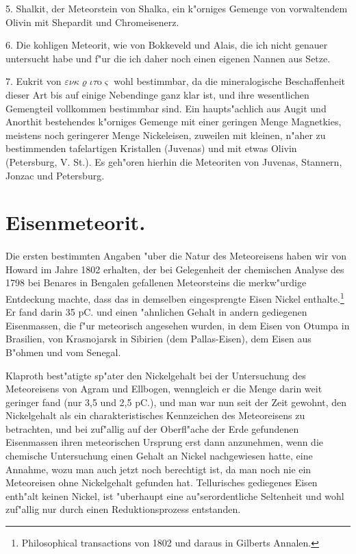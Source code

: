 \documentclass[a4paper, 11pt, oneside]{article}
\begin{document}
5. Shalkit, der Meteorstein von Shalka, ein k"orniges Gemenge von vorwaltendem Olivin mit Shepardit und Chromeisenerz.

6. Die kohligen Meteorit, wie von Bokkeveld und Alais, die ich nicht genauer untersucht habe und f"ur die ich daher noch einen eigenen Nannen aus Setze.

7. Eukrit von $\varepsilon\nu\kappa\varrho\iota\tau$o$\varsigma$ wohl bestimmbar, da die mineralogische Beschaffenheit dieser Art bis auf einige Nebendinge ganz klar ist, und ihre wesentlichen Gemengteil vollkommen bestimmbar sind. Ein haupts"achlich aus Augit und Anorthit bestehendes k"orniges Gemenge mit einer geringen Menge Magnetkies, meistens noch geringerer Menge Nickeleisen, zuweilen mit kleinen, n"aher zu bestimmenden tafelartigen Kristallen (Juvenas) und mit etwas Olivin (Petersburg, V. St.). Es geh"oren hierhin die Meteoriten von Juvenas, Stannern, Jonzac und Petersburg.
\clearpage
\section{Eisenmeteorit.}
\paragraph{}
Die ersten bestimmten Angaben "uber die Natur des Meteoreisens haben wir von Howard im Jahre 1802 erhalten, der bei Gelegenheit der chemischen Analyse des 1798 bei Benares in Bengalen gefallenen Meteorsteins die merkw"urdige Entdeckung machte, dass das in demselben eingesprengte Eisen Nickel enthalte.\footnote{Philosophical transactions von 1802 und daraus in Gilberts Annalen.} Er fand darin 35 pC. und einen "ahnlichen Gehalt in andern gediegenen Eisenmassen, die f"ur meteorisch angesehen wurden, in dem Eisen von Otumpa in Brasilien, von Krasnojarsk in Sibirien (dem Pallas-Eisen), dem Eisen aus B"ohmen und vom Senegal.

Klaproth best"atigte sp"ater den Nickelgehalt bei der Untersuchung des Meteoreisens von Agram und Ellbogen, wenngleich er die Menge darin weit geringer fand (nur 3,5 und 2,5 pC.), und man war nun seit der Zeit gewohnt, den Nickelgehalt als ein charakteristisches Kennzeichen des Meteoreisens zu betrachten, und bei zuf"allig auf der Oberfl"ache der Erde gefundenen Eisenmassen ihren meteorischen Ursprung erst dann anzunehmen, wenn die chemische Untersuchung einen Gehalt an Nickel nachgewiesen hatte, eine Annahme, wozu man auch jetzt noch berechtigt ist, da man noch nie ein Meteoreisen ohne Nickelgehalt gefunden hat. Tellurisches gediegenes Eisen enth"alt keinen Nickel, ist "uberhaupt eine au"serordentliche Seltenheit und wohl zuf"allig nur durch einen Reduktionsprozess entstanden.
\end{document}

